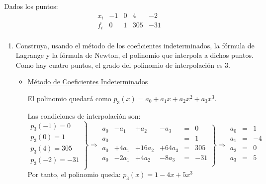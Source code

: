 \begin{ejercicio}
    Dados los puntos:
    \begin{equation*}
        \begin{array}{c|ccccc}
            x_i & -1 & 0 & 4 & -2 \\ \hline
            f_i & 0 & 1 & 305 & -31 \\
        \end{array}
    \end{equation*}

    \begin{enumerate}
        \item Construya, usando el método de los coeficientes indeterminados, la fórmula de Lagrange y la fórmula de Newton, el polinomio que interpola a dichos puntos.\\

        Como hay cuatro puntos, el grado del polinomio de interpolación es 3.
        \begin{itemize}
            \item \underline{Método de Coeficientes Indeterminados}

            El polinomio quedará como $p_{3}(x) = a_0+a_1x + a_2x^2 + a_3x^3$.

            Las condiciones de interpolación son:
            \begin{equation*}
                \left. \begin{array}{l}
                    p_3(-1)=0 \\
                    p_3(0)=1 \\
                    p_3(4)=305 \\
                    p_3(-2)=-31 \\
                \end{array} \right\} \Longrightarrow
                \left. \begin{array}{rrrrrr}
                    a_0 & -a_1 & +a_2 & -a_3&=&0 \\
                    a_0 &&&&=&1 \\
                    a_0 & + 4a_1 &+16a_2 & +64a_3&=& 305 \\
                    a_0 &  -2a_1 &+4a_2 & -8a_3&=& -31 \\
                \end{array} \right\} \Longrightarrow
                \left. \begin{array}{rcr}
                    a_0&=&1 \\
                    a_1&=&-4 \\
                    a_2&=&0 \\
                    a_3&=&5 \\
                \end{array} \right.
            \end{equation*}
            Por tanto, el polinomio queda: $p_{3}(x) = 1-4x + 5x^3$


\end{itemize}
\end{enumerate}
\end{ejercicio}
